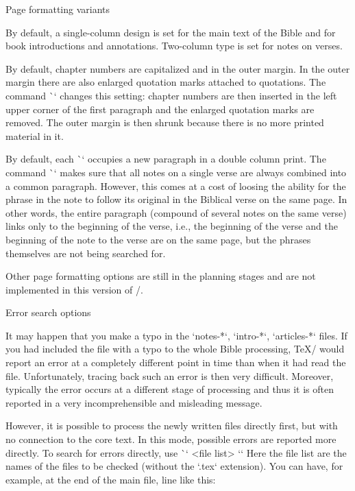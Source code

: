 {{\endtt
\sec Page formatting variants

By default, a single-column design is set for the main text of the Bible
and for book introductions and annotations. Two-column type is set for
notes on verses.

By default, chapter numbers are capitalized and in the outer margin. 
In the outer margin there are also enlarged quotation marks attached to quotations. 
The command \`\normalchapnumbers` changes this setting: chapter numbers are then inserted in the left
upper corner of the first paragraph and the enlarged quotation marks are removed.
The outer margin is then shrunk because there is no more printed material in it.  



By default, each \`\Note` occupies a new paragraph in a  double column print. 
The command \`\mergednotes` makes sure that all notes on a single verse are always 
combined into a common paragraph. 
However, this comes at a cost of loosing the ability for the phrase in the note
to follow its original in the Biblical verse on the same page.
In other words, the entire paragraph (compound of several notes on the same verse)
links only  to the beginning of the verse, i.e., the beginning of the verse 
and the beginning of the note to the verse are on the same page,
but the phrases themselves are not being searched for.

Other page formatting options are still in the planning stages and are not implemented in this version of \OpBible/.


\sec Error search options

It may happen that you make a typo in the `notes-*`, `intro-*`,
`articles-*` files. If you had included the file with a typo to the whole Bible processing,
\TeX/ would report an error at a completely different point in time than when it had read the file. 
Unfortunately, tracing back such an error is then very difficult. Moreover, typically the error
occurs at a different stage of processing and thus it is often reported in a very
incomprehensible and misleading message.

However, it is possible to process the newly written files directly first, but with no
connection to the core text. In this mode, possible errors are reported more directly.
To search for errors directly, use \`\checksyntax` <file list> `{}`
Here the file list are the names of the files to be checked (without the `.tex` extension).
You can have, for example, at the end of the main file, line like this:

}}
